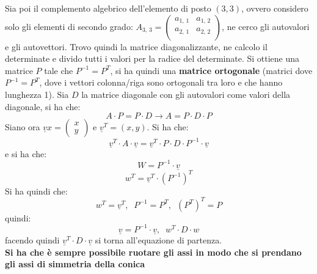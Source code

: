 \documentclass[a4paper,12pt, oneside]{book}
\begin{document}
\begin{teorema}
 Sia poi il complemento algebrico dell'elemento di posto $(3,3)$, ovvero considero solo gli elementi di secondo grado: $A_{3,\,3}=\left(\begin{matrix}
a_{1,\,1} & a_{1,\,2} \\
a_{2,\,1} & a_{2,\,2} \\
\end{matrix}\right)$, ne cerco gli autovalori e gli autovettori. Trovo quindi la matrice diagonalizzante, ne calcolo il determinate e divido tutti i valori per la radice del determinate. Si ottiene una matrice $P$ tale che $P^{-1}=P^T$, si ha quindi una \textbf{matrice ortogonale} (matrici dove $P^{-1}=P^T$, dove i vettori colonna/riga sono ortogonali tra loro e che hanno lunghezza 1). Sia $D$ la matrice diagonale con gli autovalori come valori della diagonale, si ha che:
$$A\cdot P=P\cdot D\longrightarrow A=P\cdot D\cdot P$$
Siano ora $\underline{v}x=
\left(\begin{matrix}
x\\
y
\end{matrix}\right)
$ e $\underline{v}^T=(x,y)$. Si ha che:
$$\underline{v}^T\cdot A\cdot \underline{v}=\underline{v}^T\cdot P\cdot D\cdot P^{-1}\cdot \underline{v}$$ e si ha che:
$$W=P^{-1}\cdot \underline{v}$$
$$w^T=\underline{v}^T\cdot (P^{-1})^T$$
Si ha quindi che:
$$w^T=\underline{v}^T,\,\,\ P^{-1}=P^T,\,\,\, (P^T)^T=P$$
quindi:
$$\underline{v}=P^{-1}\cdot \underline{v},\,\,\ w^T\cdot D\cdot w$$
facendo quindi $\underline{v}^T\cdot D\cdot \underline{v}$ si torna all'equazione di partenza.\\
\textbf{Si ha che è sempre possibile ruotare gli assi in modo che si prendano gli assi di simmetria della conica}
\end{teorema}
\end{document}
